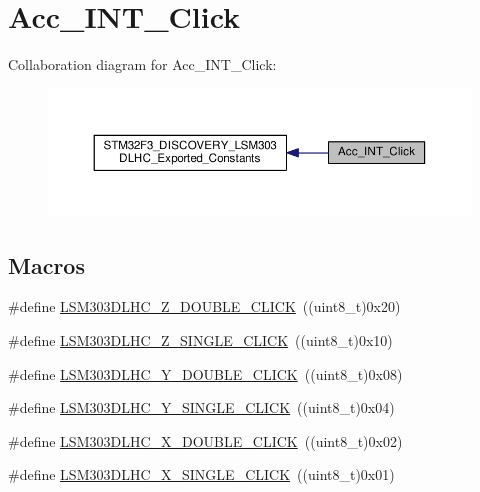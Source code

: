 \hypertarget{group__Acc__INT__Click}{\section{Acc\+\_\+\+I\+N\+T\+\_\+\+Click}
\label{group__Acc__INT__Click}
}
Collaboration diagram for Acc\+\_\+\+I\+N\+T\+\_\+\+Click\+:\nopagebreak
\begin{figure}[H]
\begin{center}
\leavevmode
\includegraphics[width=350pt]{group__Acc__INT__Click}
\end{center}
\end{figure}
\subsection*{Macros}
\begin{DoxyCompactItemize}
\item 
\#define \hyperlink{group__Acc__INT__Click_ga57f89e32a0796fcaeabcf56dc76c045d}{L\+S\+M303\+D\+L\+H\+C\+\_\+\+Z\+\_\+\+D\+O\+U\+B\+L\+E\+\_\+\+C\+L\+I\+C\+K}~((uint8\+\_\+t)0x20)
\item 
\#define \hyperlink{group__Acc__INT__Click_gadb2bfc2af08d486302a5fae904bf9ee4}{L\+S\+M303\+D\+L\+H\+C\+\_\+\+Z\+\_\+\+S\+I\+N\+G\+L\+E\+\_\+\+C\+L\+I\+C\+K}~((uint8\+\_\+t)0x10)
\item 
\#define \hyperlink{group__Acc__INT__Click_ga5e418b2648de257703be30b52f9cda6d}{L\+S\+M303\+D\+L\+H\+C\+\_\+\+Y\+\_\+\+D\+O\+U\+B\+L\+E\+\_\+\+C\+L\+I\+C\+K}~((uint8\+\_\+t)0x08)
\item 
\#define \hyperlink{group__Acc__INT__Click_gad443192ec1dda1da2db1bc6a5d54c400}{L\+S\+M303\+D\+L\+H\+C\+\_\+\+Y\+\_\+\+S\+I\+N\+G\+L\+E\+\_\+\+C\+L\+I\+C\+K}~((uint8\+\_\+t)0x04)
\item 
\#define \hyperlink{group__Acc__INT__Click_gac0eb0c3156b15d3785768b558e1b03db}{L\+S\+M303\+D\+L\+H\+C\+\_\+\+X\+\_\+\+D\+O\+U\+B\+L\+E\+\_\+\+C\+L\+I\+C\+K}~((uint8\+\_\+t)0x02)
\item 
\#define \hyperlink{group__Acc__INT__Click_gaf6a40b940a61d88b747e7212584dfe66}{L\+S\+M303\+D\+L\+H\+C\+\_\+\+X\+\_\+\+S\+I\+N\+G\+L\+E\+\_\+\+C\+L\+I\+C\+K}~((uint8\+\_\+t)0x01)
\end{DoxyCompactItemize}


